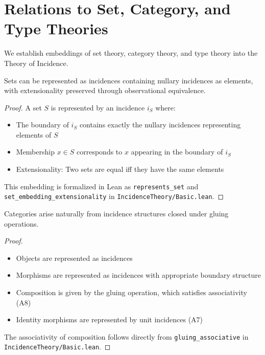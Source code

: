 \documentclass{article}
\begin{document}
\section{Relations to Set, Category, and Type Theories}

We establish embeddings of set theory, category theory, and type theory into the Theory of Incidence.

\begin{theorem}
\label{thm:set-embedding}
Sets can be represented as incidences containing nullary incidences as elements, with extensionality preserved through observational equivalence.
\end{theorem}

\begin{proof}
A set $S$ is represented by an incidence $i_S$ where:
\begin{itemize}
\item The boundary of $i_S$ contains exactly the nullary incidences representing elements of $S$
\item Membership $x \in S$ corresponds to $x$ appearing in the boundary of $i_S$
\item Extensionality: Two sets are equal iff they have the same elements
\end{itemize}

This embedding is formalized in Lean as \texttt{represents\_set} and \texttt{set\_embedding\_extensionality} in \texttt{IncidenceTheory/Basic.lean}.
\end{proof}

\begin{theorem}
\label{thm:category-embedding}
Categories arise naturally from incidence structures closed under gluing operations.
\end{theorem}

\begin{proof}
\begin{itemize}
\item Objects are represented as incidences
\item Morphisms are represented as incidences with appropriate boundary structure
\item Composition is given by the gluing operation, which satisfies associativity (A8)
\item Identity morphisms are represented by unit incidences (A7)
\end{itemize}

The associativity of composition follows directly from \texttt{gluing\_associative} in \texttt{IncidenceTheory/Basic.lean}.
\end{proof}
\end{document}
